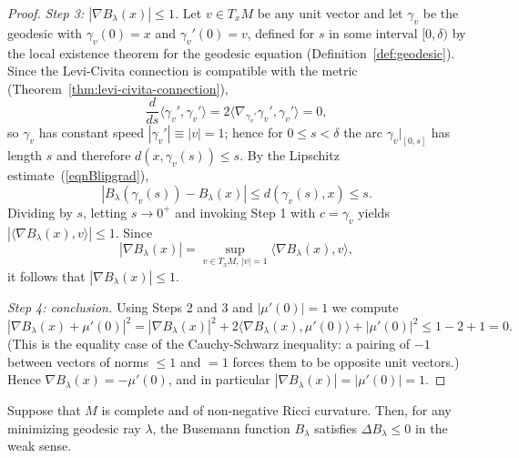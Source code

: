 \begin{proof}
{\em Step 3: $|\nabla B_\lambda(x)|\le 1$.} Let $v\in T_xM$ be any
unit vector and let $\gamma_v$ be the geodesic with
$\gamma_v(0)=x$ and $\gamma_v'(0)=v$, defined for $s$ in some
interval $[0,\delta)$ by the local existence theorem for the
geodesic equation (Definition~\ref{def:geodesic}). Since the
Levi-Civita connection is compatible with the metric
(Theorem~\ref{thm:levi-civita-connection}),
$$\frac{d}{ds}\langle\gamma_v',\gamma_v'\rangle
=2\langle\nabla_{\gamma_v'}\gamma_v',\gamma_v'\rangle=0,$$
so $\gamma_v$ has constant speed $|\gamma_v'|\equiv|v|=1$; hence
for $0\le s<\delta$ the arc $\gamma_v|_{[0,s]}$ has length $s$ and
therefore $d(x,\gamma_v(s))\le s$. By the Lipschitz
estimate~(\ref{eqnBlipgrad}),
$$\left|B_\lambda(\gamma_v(s))-B_\lambda(x)\right|
\le d(\gamma_v(s),x)\le s.$$
Dividing by $s$, letting $s\rightarrow 0^+$ and invoking Step 1
with $c=\gamma_v$ yields $|\langle\nabla B_\lambda(x),v\rangle|\le
1$. Since
$$|\nabla B_\lambda(x)|=\sup_{v\in T_xM,\,|v|=1}
\langle\nabla B_\lambda(x),v\rangle,$$
it follows that $|\nabla B_\lambda(x)|\le 1$.

{\em Step 4: conclusion.} Using Steps 2 and 3 and $|\mu'(0)|=1$ we
compute
$$\left|\nabla B_\lambda(x)+\mu'(0)\right|^2
=|\nabla B_\lambda(x)|^2
+2\langle\nabla B_\lambda(x),\mu'(0)\rangle+|\mu'(0)|^2
\le 1-2+1=0.$$
(This is the equality case of the Cauchy-Schwarz inequality: a
pairing of $-1$ between vectors of norms $\le 1$ and $=1$ forces
them to be opposite unit vectors.) Hence $\nabla
B_\lambda(x)=-\mu'(0)$, and in particular $|\nabla
B_\lambda(x)|=|\mu'(0)|=1$.
\end{proof}

\begin{proposition}
\label{prop:busemann-laplacian}
\label{Blambda}
Suppose that $M$ is complete and of non-negative Ricci curvature.
Then, for any minimizing geodesic ray $\lambda$, the Busemann
function $B_\lambda$ satisfies $\Delta B_\lambda\le 0$ in the weak
sense.
\end{proposition}


